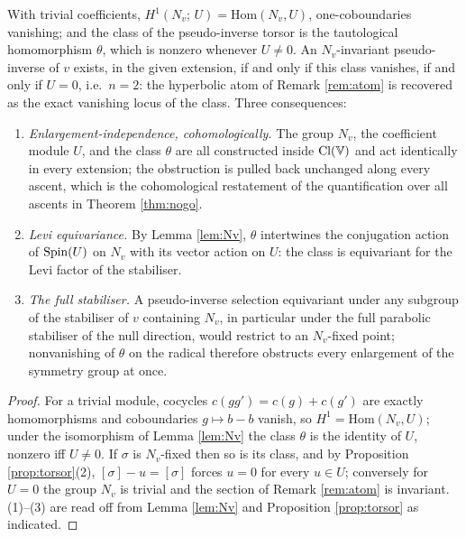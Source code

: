 \begin{theorem}\label{thm:cohomological}
With trivial coefficients, $H^1(N_v;\, U) = \mathrm{Hom}(N_v, U)$, one-coboundaries vanishing; and the class of the pseudo-inverse torsor is the tautological homomorphism $\theta$, which is nonzero whenever $U \neq 0$. An $N_v$-invariant pseudo-inverse of $v$ exists, in the given extension, if and only if this class vanishes, if and only if $U = 0$, i.e.\ $n = 2$: the hyperbolic atom of Remark \ref{rem:atom} is recovered as the exact vanishing locus of the class. Three consequences:
\begin{enumerate}
\item \emph{Enlargement-independence, cohomologically.} The group $N_v$, the coefficient module $U$, and the class $\theta$ are all constructed inside $\mathrm{Cl}(\mathbb{V})$ and act identically in every extension; the obstruction is pulled back unchanged along every ascent, which is the cohomological restatement of the quantification over all ascents in Theorem \ref{thm:nogo}.
\item \emph{Levi equivariance.} By Lemma \ref{lem:Nv}, $\theta$ intertwines the conjugation action of $\mathrm{Spin}(U)$ on $N_v$ with its vector action on $U$: the class is equivariant for the Levi factor of the stabiliser.
\item \emph{The full stabiliser.} A pseudo-inverse selection equivariant under any subgroup of the stabiliser of $v$ containing $N_v$, in particular under the full parabolic stabiliser of the null direction, would restrict to an $N_v$-fixed point; nonvanishing of $\theta$ on the radical therefore obstructs every enlargement of the symmetry group at once.
\end{enumerate}
\end{theorem}

\begin{proof}
For a trivial module, cocycles $c(gg') = c(g) + c(g')$ are exactly homomorphisms and coboundaries $g \mapsto b - b$ vanish, so $H^1 = \mathrm{Hom}(N_v, U)$; under the isomorphism of Lemma \ref{lem:Nv} the class $\theta$ is the identity of $U$, nonzero iff $U \neq 0$. If $\sigma$ is $N_v$-fixed then so is its class, and by Proposition \ref{prop:torsor}(2), $[\sigma] - u = [\sigma]$ forces $u = 0$ for every $u \in U$; conversely for $U = 0$ the group $N_v$ is trivial and the section of Remark \ref{rem:atom} is invariant. (1)--(3) are read off from Lemma \ref{lem:Nv} and Proposition \ref{prop:torsor} as indicated.
\end{proof}

